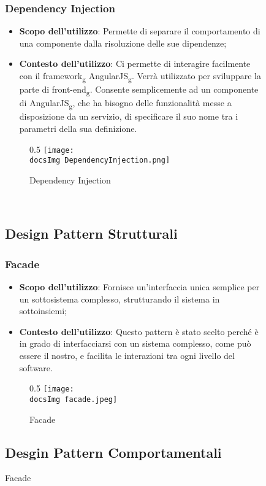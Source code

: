 \begin{figure}
		\subsubsection{Dependency Injection}
		\begin{itemize}\itemsep1pt
			\item\textbf{Scopo dell'utilizzo}: Permette di separare il comportamento di una componente dalla risoluzione delle sue dipendenze;
			\item\textbf{Contesto dell'utilizzo}: Ci permette di interagire facilmente con il framework\textsubscript{g} AngularJS\textsubscript{g}. Verrà utilizzato per sviluppare la parte di front-end\textsubscript{g}. Consente semplicemente ad un componente di AngularJS\textsubscript{g}, che ha bisogno delle funzionalità messe a disposizione da un servizio, di specificare il suo nome tra i parametri della sua definizione.
		\end{itemize}
		\begin{figure}[h]{0.5}
			\centering
			\texttt{[image: \\docsImg DependencyInjection.png]}
			\caption{Dependency Injection}
			\label{fig. Dependency Injection}
		\end{figure}
		\\

	\subsection{Design Pattern Strutturali}

		\subsubsection{Facade} 
		 \begin{itemize}
		 		\item\textbf{Scopo dell'utilizzo}: Fornisce un'interfaccia unica semplice per un sottosistema complesso, strutturando il sistema in sottoinsiemi;
		 		\item\textbf{Contesto dell'utilizzo}: Questo pattern è stato scelto perché è in grado di interfacciarsi con un sistema complesso, come può essere il nostro, e facilita le interazioni tra ogni livello del software. 
		 \end{itemize}		 	
		\begin{figure}[h]{0.5}
			\centering
			\texttt{[image: \\docsImg facade.jpeg]}
			\caption{Facade}
			\label{fig. Facade}	
		\end{figure}
		 		
	\subsection{Desgin Pattern Comportamentali} 
		

\end{figure}
